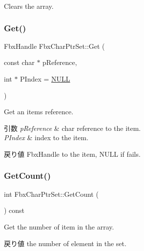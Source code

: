 Clears the array. 

\mbox{\label{class_fbx_char_ptr_set_a626ae8a1c9406567c09755f467902b84}} 
\subsubsection{\texorpdfstring{Get()}{Get()}}
{\footnotesize\ttfamily Fbx\+Handle Fbx\+Char\+Ptr\+Set\+::\+Get (\begin{DoxyParamCaption}\item[{const char $\ast$}]{p\+Reference,  }\item[{int $\ast$}]{P\+Index = {\ttfamily \hyperlink{fbxarch_8h_a070d2ce7b6bb7e5c05602aa8c308d0c4}{N\+U\+LL}} }\end{DoxyParamCaption})}

Get an item\textquotesingle{}s reference. 
\begin{DoxyParams}{引数}
{\em p\+Reference} & char reference to the item. \\
\hline
{\em P\+Index} & index to the item. \\
\hline
\end{DoxyParams}
\begin{DoxyReturn}{戻り値}
Fbx\+Handle to the item, N\+U\+LL if fails. 
\end{DoxyReturn}
\mbox{\label{class_fbx_char_ptr_set_ab62ea2f88eed06e033e4ae7c516e96a0}} 
\subsubsection{\texorpdfstring{Get\+Count()}{GetCount()}}
{\footnotesize\ttfamily int Fbx\+Char\+Ptr\+Set\+::\+Get\+Count (\begin{DoxyParamCaption}{ }\end{DoxyParamCaption}) const}

Get the number of item in the array. \begin{DoxyReturn}{戻り値}
the number of element in the set. 
\end{DoxyReturn}
\mbox{\label{class_fbx_char_ptr_set_ab201112f7e7bbdad802978c451c41680}} 
